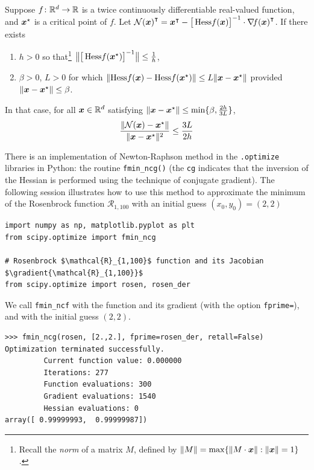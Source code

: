 \begin{theorem}\label{theorem:QuadraticConvergence}
Suppose $f\colon \mathbb{R}^d \to \mathbb{R}$ is a twice continuously differentiable real-valued function, and $\boldsymbol{x}^{\star}$ is a critical point of $f$. Let ${\mathcal{N}(\boldsymbol{x})}^\intercal = {\boldsymbol{x}}^\intercal - \big[ \mathop{\mathrm{Hess}{f}}(\boldsymbol{x}) \big]^{-1} \cdot {\mathop{\nabla\! {f}}(\boldsymbol{x})}^\intercal$. If there exists 
\begin{enumerate}
	\item $h>0$ so that\footnote{Recall the \emph{norm} of a matrix $M$, defined by $\lVert M \rVert = \max\{ \lVert M\cdot \boldsymbol{x} \rVert : \lVert \boldsymbol{x} \rVert=1 \}$.} $\big\lVert \big[ \mathop{\mathrm{Hess}{f}}(\boldsymbol{x}^{\star})\big]^{-1} \big\rVert \leq \tfrac{1}{h}$,
	\item $\beta>0$, $L>0$ for which $\lVert \mathop{\mathrm{Hess}{f}}(\boldsymbol{x}) - \mathop{\mathrm{Hess}{f}}(\boldsymbol{x}^{\star}) \rVert \leq L \lVert  \boldsymbol{x} - \boldsymbol{x}^{\star}  \rVert$ provided $\lVert  \boldsymbol{x} - \boldsymbol{x}^{\star}  \rVert\leq \beta$.
\end{enumerate}
In that case, for all $\boldsymbol{x} \in \mathbb{R}^d$ satisfying $\lVert  \boldsymbol{x} - \boldsymbol{x}^{\star}  \rVert\leq \min \{\beta, \tfrac{2h}{3L} \}$,
\begin{equation*}
\frac{\lVert  \mathcal{N}(\boldsymbol{x}) - \boldsymbol{x}^{\star}  \rVert}{\lVert \boldsymbol{x} - \boldsymbol{x}^{\star} \rVert^2} \leq \frac{3L}{2h}
\end{equation*}
\end{theorem}

\begin{example}
There is an implementation of Newton-Raphson method in the \scipy\texttt{.optimize} libraries in Python: the routine \texttt{fmin\_ncg()} (the \texttt{cg} indicates that the inversion of the Hessian is performed using the technique of conjugate gradient).  The following session illustrates how to use this method to approximate the minimum of the Rosenbrock function $\mathcal{R}_{1,100}$ with an initial guess $(x_0, y_0) = (2,2)$

\begin{verbatim}
import numpy as np, matplotlib.pyplot as plt 
from scipy.optimize import fmin_ncg

# Rosenbrock $\mathcal{R}_{1,100}$ function and its Jacobian $\gradient{\mathcal{R}_{1,100}}$
from scipy.optimize import rosen, rosen_der
\end{verbatim}

We call \texttt{fmin\_ncf} with the function and its gradient (with the option \texttt{fprime=}), and with the initial guess $(2,2)$.

\begin{verbatim}
>>> fmin_ncg(rosen, [2.,2.], fprime=rosen_der, retall=False)
Optimization terminated successfully.
         Current function value: 0.000000
         Iterations: 277
         Function evaluations: 300
         Gradient evaluations: 1540
         Hessian evaluations: 0
array([ 0.99999993,  0.99999987])
\end{verbatim}
\end{example}

